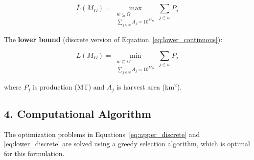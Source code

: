 \documentclass[11pt]{article}
\begin{document}
\begin{equation}
\overline{L}(M_D) = \max_{\substack{w \subseteq \Omega \\ \sum_{j \in w} A_j = 10^{M_D}}} \sum_{j \in w} P_j
\label{eq:upper_discrete}
\end{equation}

The \textbf{lower bound} (discrete version of Equation~\ref{eq:lower_continuous}):

\begin{equation}
\underline{L}(M_D) = \min_{\substack{w \subseteq \Omega \\ \sum_{j \in w} A_j = 10^{M_D}}} \sum_{j \in w} P_j
\label{eq:lower_discrete}
\end{equation}

where $P_j$ is production (MT) and $A_j$ is harvest area (km$^2$).

\subsection*{4. Computational Algorithm}

The optimization problems in Equations~\ref{eq:upper_discrete} and \ref{eq:lower_discrete} are solved using a greedy selection algorithm\cite{cormen2009introduction}, which is optimal for this formulation\cite{dantzig1957discrete}.
\end{document}
